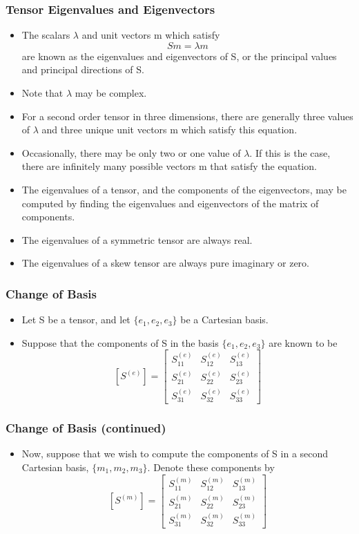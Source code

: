 \documentclass{beamer}
\begin{document}
\begin{frame}
\frametitle{Tensor Eigenvalues and Eigenvectors}
\begin{itemize}
    \item The scalars \(\lambda\) and unit vectors m which satisfy
    \[
    S m = \lambda m
    \]
    are known as the eigenvalues and eigenvectors of S, or the principal values and principal directions of S.
    \item Note that \(\lambda\) may be complex.
    \item For a second order tensor in three dimensions, there are generally three values of \(\lambda\) and three unique unit vectors m which satisfy this equation.
    \item Occasionally, there may be only two or one value of \(\lambda\). If this is the case, there are infinitely many possible vectors m that satisfy the equation.
    \item The eigenvalues of a tensor, and the components of the eigenvectors, may be computed by finding the eigenvalues and eigenvectors of the matrix of components.
    \item The eigenvalues of a symmetric tensor are always real.
    \item The eigenvalues of a skew tensor are always pure imaginary or zero.
\end{itemize}
\end{frame}

\begin{frame}
\frametitle{Change of Basis}
\begin{itemize}
    \item Let S be a tensor, and let \(\{e_1, e_2, e_3\}\) be a Cartesian basis.
    \item Suppose that the components of S in the basis \(\{e_1, e_2, e_3\}\) are known to be
    \[
    [S^{(e)}] =
    \begin{bmatrix}
        S_{11}^{(e)} & S_{12}^{(e)} & S_{13}^{(e)} \\
        S_{21}^{(e)} & S_{22}^{(e)} & S_{23}^{(e)} \\
        S_{31}^{(e)} & S_{32}^{(e)} & S_{33}^{(e)}
    \end{bmatrix}
    \]
\end{itemize}
\end{frame}

\begin{frame}
\frametitle{Change of Basis (continued)}
\begin{itemize}
    \item Now, suppose that we wish to compute the components of S in a second Cartesian basis, \(\{m_1, m_2, m_3\}\). Denote these components by
    \[
    [S^{(m)}] =
    \begin{bmatrix}
        S_{11}^{(m)} & S_{12}^{(m)} & S_{13}^{(m)} \\
        S_{21}^{(m)} & S_{22}^{(m)} & S_{23}^{(m)} \\
        S_{31}^{(m)} & S_{32}^{(m)} & S_{33}^{(m)}
    \end{bmatrix}
    \]
\end{itemize}
\end{frame}
\end{document}
